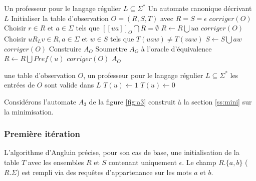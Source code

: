 \begin{algo}\label{alg:angluin}
  \begin{algorithmic}[1]
    \REQUIRE Un professeur pour le langage régulier $L\subseteq\Sigma^*$
		\ENSURE Un automate canonique décrivant $L$
		\STATE Initialiser la table d'observation $O=(R,S,T)$ avec $R=S={\epsilon}$
		\STATE $corriger(O)$
		\REPEAT
					\STATE Choisir $r\in R$ et $a\in\Sigma$ tels que $[[ua]]_O\bigcap R=\emptyset$
					\STATE $R\leftarrow R\bigcup {ua}$
					\STATE $corriger(O)$
				\ENDIF
					\STATE Choisir $uR_Lv \in R, a\in\Sigma$ et $w\in S$ tels que $T(uaw)\neq T(vaw)$
					\STATE $S\leftarrow S \bigcup {aw}$
					\STATE $corriger(O)$
				\ENDIF
			\ENDWHILE
			\STATE Construire $A_O$
			\STATE Soumettre $A_O$ à l'oracle d'équivalence
				\STATE $R\leftarrow R\bigcup Pref(u)$
				\STATE $corriger(O)$
			\ENDIF
		\RETURN $A_O$
  \end{algorithmic}
\end{algo}

\begin{algo}[$corriger(O)$]\label{alg:corr}
  \begin{algorithmic}[1]
		\REQUIRE une table d'observation $O$, un professeur pour le langage régulier $L\subseteq\Sigma^*$
		\ENSURE les entrées de $O$ sont valide dans $L$
				\STATE $T(u)\leftarrow 1$
			\ELSE
				\STATE $T(u)\leftarrow 0$
			\ENDIF
		\ENDFOR
	\end{algorithmic}
\end{algo}
 
Considérons l'automate $A_3$ de la figure \ref{fig:a3} construit à la section \ref{ss:mini} sur la minimisation.


\subsubsection{Première itération}

L'algorithme d'Angluin précise, pour son cas de base, une initialisation de la table $T$ avec les ensembles $R$ et $S$ contenant uniquement $\epsilon$. Le champ $R.\{a,b\}$ ($R.\Sigma$) est rempli via des requêtes d'appartenance sur les mots $a$ et $b$.

